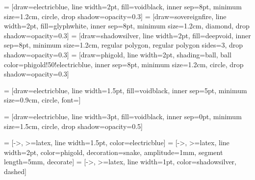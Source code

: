 

 = [draw=electricblue, line width=2pt, fill=voidblack,
    inner sep=8pt, minimum size=1.2cm, circle,
    drop shadow={opacity=0.3}]
 = [draw=sovereignfire, line width=2pt, fill=glyphwhite,
    inner sep=8pt, minimum size=1.2cm, diamond,
    drop shadow={opacity=0.3}]
 = [draw=shadowsilver, line width=2pt, fill=deepvoid,
    inner sep=8pt, minimum size=1.2cm, regular polygon, regular polygon sides=3,
    drop shadow={opacity=0.3}]
 = [draw=phigold, line width=2pt,
    shading=ball, ball color=phigold!50!electricblue,
    inner sep=8pt, minimum size=1.2cm, circle,
    drop shadow={opacity=0.3}]

 = [draw=electricblue, line width=1.5pt, fill=voidblack,
    inner sep=5pt, minimum size=0.9cm, circle,
    font=\footnotesize\color{glyphwhite}]

 = [draw=electricblue, line width=3pt,
    fill=voidblack, inner sep=0pt, minimum size=1.5cm, circle,
    drop shadow={opacity=0.5}]

 = [->, >=latex, line width=1.5pt, color=electricblue]
 = [->, >=latex, line width=2pt, color=phigold,
    decoration={snake, amplitude=1mm, segment length=5mm}, decorate]
 = [->, >=latex, line width=1pt, color=shadowsilver, dashed]

